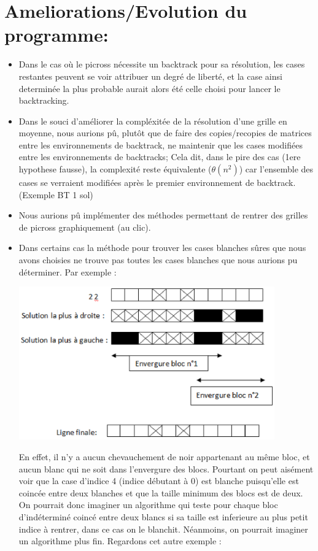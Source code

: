 \documentclass{article}
\begin{document}
\section{Ameliorations/Evolution du programme:}
\begin{itemize}
\item Dans le cas où le picross nécessite un backtrack pour sa résolution, les cases restantes peuvent se voir attribuer un degré de liberté, et la case ainsi determinée la plus probable aurait alors été celle choisi pour lancer le backtracking.
\item Dans le souci d'améliorer la compléxitée de la résolution d'une grille en moyenne, nous aurions pû, plutôt que de faire des copies/recopies de matrices entre les environnements de backtrack, ne maintenir que les cases modifiées entre les environnements de backtracks;
Cela dit, dans le pire des cas (1ere hypothese fausse), la complexité reste équivalente ($\theta(n^2)$) car l'ensemble des cases se verraient modifiées après le premier environnement de backtrack. (Exemple BT 1 sol)
\item Nous aurions pû implémenter des méthodes permettant de rentrer des grilles de picross graphiquement (au clic).
\item Dans certains cas la méthode pour trouver les cases blanches sûres que nous avons choisies ne trouve pas toutes les cases blanches que nous aurions pu déterminer. Par exemple :
\begin{center}
\includegraphics[width=11cm]{image1}
\end{center}
En effet, il n’y a aucun chevauchement de noir appartenant au même bloc, et aucun blanc qui ne soit dans l’envergure des blocs. Pourtant on peut aisément voir que la case d’indice 4 (indice débutant à 0) est blanche puisqu’elle est coincée entre deux blanches et que la taille minimum des blocs est de deux. On pourrait donc imaginer un algorithme qui teste pour chaque bloc d’indéterminé coincé entre deux blancs si sa taille est inferieure au plus petit indice à rentrer,  dans ce cas on le blanchit. Néanmoins, on pourrait imaginer un algorithme plus fin. Regardons cet autre exemple :

\end{itemize}
\end{document}
